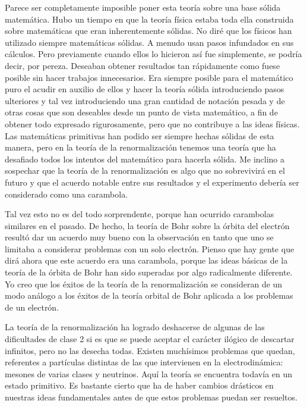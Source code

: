 \documentclass[a4paper, 12pt]{article}
\begin{document}
Parece ser completamente imposible poner esta teoría sobre una base sólida matemática. Hubo un tiempo en que la teoría física estaba toda ella construida sobre matemáticas que eran inherentemente sólidas. No diré que los físicos han utilizado siempre matemáticas sólidas. A menudo usan pasos infundados en sus cálculos. Pero previamente cuando ellos lo hicieron así fue simplemente, se podría decir, por pereza. Deseaban obtener resultados tan rápidamente como fuese posible sin hacer trabajos innecesarios. Era siempre posible para el matemático puro el acudir en auxilio de ellos y hacer la teoría sólida introduciendo pasos ulteriores y tal vez introduciendo una gran cantidad de notación pesada y de otras cosas que son deseables desde un punto de vista matemático, a fin de obtener todo expresado rigurosamente, pero que no contribuye a las ideas físicas. Las matemáticas primitivas han podido ser siempre hechas sólidas de esta manera, pero en la teoría de la renormalización tenemos una teoría que ha desafiado todos los intentos del matemático para hacerla sólida. Me inclino a sospechar que la teoría de la renormalización es algo que no sobrevivirá en el futuro y que el acuerdo notable entre sus resultados y el experimento debería ser considerado como una carambola.

Tal vez esto no es del todo sorprendente, porque han ocurrido carambolas similares en el pasado. De hecho, la teoría de Bohr sobre la órbita del electrón resultó dar un acuerdo muy bueno con la observación en tanto que uno se limitaba a considerar problemas con un solo electrón. Pienso que hay gente que dirá ahora que este acuerdo era una carambola, porque las ideas básicas de la teoría de la órbita de Bohr han sido superadas por algo radicalmente diferente. Yo creo que los éxitos de la teoría de la renormalización se consideran de un modo análogo a los éxitos de la teoría orbital de Bohr aplicada a los problemas de un electrón.

La teoría de la renormalización ha logrado deshacerse de algunas de las dificultades de clase 2 si es que se puede aceptar el carácter ilógico de descartar infinitos, pero no las desecha todas. Existen muchísimos problemas que quedan, referentes a partículas distintas de las que intervienen en la electrodinámica: mesones de varias clases y neutrinos. Aquí la teoría se encuentra todavía en un estado primitivo. Es bastante cierto que ha de haber cambios drásticos en nuestras ideas fundamentales antes de que estos problemas puedan ser resueltos.
\end{document}
